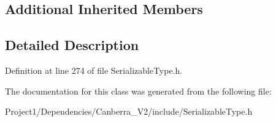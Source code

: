 \subsection*{Additional Inherited Members}


\subsection{Detailed Description}


Definition at line 274 of file Serializable\+Type.\+h.



The documentation for this class was generated from the following file\+:\begin{DoxyCompactItemize}
\item 
Project1/\+Dependencies/\+Canberra\+\_\+\+V2/include/Serializable\+Type.\+h\end{DoxyCompactItemize}
